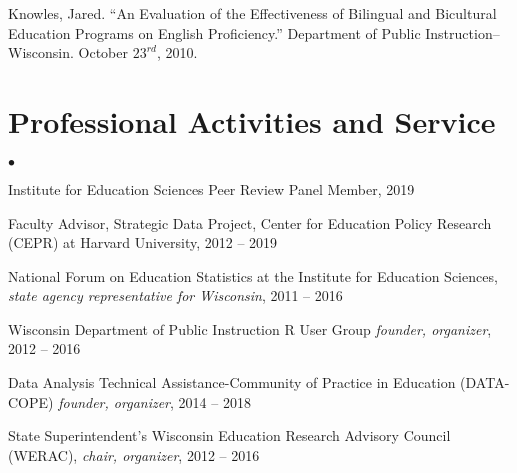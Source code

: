 \documentclass[margin,line]{res}
\newenvironment{list2}{
  \begin{list}{$\bullet$}{%
      \setlength{\itemsep}{0in}
      \setlength{\parsep}{0in} \setlength{\parskip}{0in}
      \setlength{\topsep}{0in} \setlength{\partopsep}{0in} 
      \setlength{\leftmargin}{0.2in}}}{\end{list}}
\begin{document}
\begin{resume}
Knowles, Jared. ``An Evaluation of the Effectiveness of Bilingual and Bicultural Education Programs on English Proficiency.'' Department of Public Instruction--Wisconsin. October $23^{rd}$, 2010. 


\section{\sc Professional Activities and Service}
% 
\begin{list2}
\item Institute for Education Sciences Peer Review Panel Member, 2019
\item Faculty Advisor, Strategic Data Project, Center for Education Policy Research (CEPR) at Harvard University, 2012 -- 2019
\item National Forum on Education Statistics at the Institute for Education Sciences, \emph{state agency representative for Wisconsin}, 2011 -- 2016
\item Wisconsin Department of Public Instruction R User Group \emph{founder, organizer}, 
2012 -- 2016 
\item Data Analysis Technical Assistance-Community of Practice in Education 
(DATA-COPE) \emph{founder, organizer}, 2014 -- 2018
\item State Superintendent's Wisconsin Education Research Advisory Council (WERAC), 
\emph{chair, organizer}, 2012 -- 2016
\end{list2}

% 



% 



\end{resume}
\end{document}
